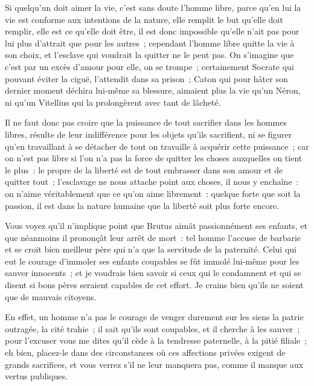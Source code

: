 \documentclass[french,twoside]{book} %
\begin{document}
Si quelqu’un doit aimer la vie, c’est sans doute l’homme libre, parce qu’en lui la vie est conforme aux intentions de la nature, elle remplit le but qu’elle doit remplir, elle est ce qu’elle doit être, il est donc impossible qu’elle n’ait pas pour lui plus d’attrait que pour les autres ; cependant l’homme libre quitte la vie à son choix, et l’esclave qui voudrait la quitter ne le peut pas. On s’imagine que c’est par un excès d’amour pour elle, on se trompe ; certainement Socrate qui pouvant éviter la ciguë, l’attendit dans sa prison ; Caton qui pour hâter son dernier moment déchira lui-même sa blessure, aimaient plus la vie qu’un Néron, ni qu’un Vitellius qui la prolongèrent avec tant de lâcheté.\par
Il ne faut donc pas croire que la puissance de tout sacrifier dans les hommes libres, résulte de leur indifférence pour les objets qu’ils sacrifient, ni se figurer qu’en travaillant à se détacher de tout on travaille à acquérir cette puissance ; car on n’est pas libre si l’on n’a pas la force de quitter les choses auxquelles on tient le plus : le propre de la liberté est de tout embrasser dans son amour et de quitter tout ; l’esclavage ne nous attache point aux choses, il nous y enchaîne : on n’aime véritablement que ce qu’on aime librement : quelque forte que soit la passion, il est dans la nature humaine que la liberté soit plus forte encore.\par
Vous voyez qu’il n’implique point que Brutus aimât passionnément ses enfants, et que néanmoins il prononçât leur arrêt de mort : tel homme l’accuse de barbarie et se croit bien meilleur père qui n’a que la servitude de la paternité. Celui qui eut le courage d’immoler ses enfants coupables se fût immolé lui-même pour les sauver innocents ; et je voudrais bien savoir si ceux qui le condamnent et qui se disent si bons pères seraient capables de cet effort. Je crains bien qu’ils ne soient que de mauvais citoyens.\par
En effet, un homme n’a pas le courage de venger durement sur les siens la patrie outragée, la cité trahie ; il sait qu’ils sont coupables, et il cherche à les sauver ; pour l’excuser vous me dites qu’il cède à la tendresse paternelle, à la pitié filiale ; eh bien, placez-le dans des circonstances où ces affections privées exigent de grands sacrifices, et vous verrez s’il ne leur manquera pas, comme il manque aux vertus publiques.\par
\end{document}
